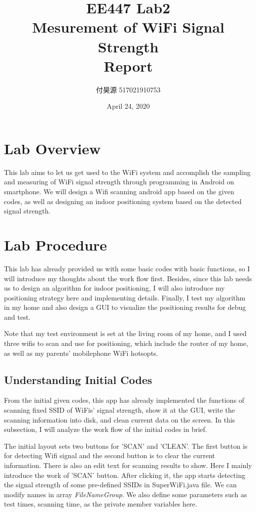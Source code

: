 \documentclass{article}
\title{\textbf{EE447 Lab2 \\ Mesurement of WiFi Signal Strength\\ Report}}
\author{付昊源 517021910753}
\date{April 24, 2020}
\begin{document}
\maketitle

\section{Lab Overview}
This lab aims to let us get used to the WiFi system and accomplish the sampling and measuring of WiFi signal strength through programming in Android on smartphone. We will design a Wifi scanning android app based on the given codes, as well as designing an indoor positioning system based on the detected signal strength.
\section{Lab Procedure}
This lab has already provided us with some basic codes with basic functions, so I will introduce my thoughts about the work flow first. Besides, since this lab needs us to design an algorithm for indoor positioning, I will also introduce my positioning strategy here and implementing details. Finally, I test my algorithm in my home and also design a GUI to visualize the positioning results for debug and test.

Note that my test environment is set at the living room of my home, and I used three wifis to scan and use for positioning, which include the router of my home, as well as my parents' mobilephone WiFi hotsopts.

\subsection{Understanding Initial Codes}
From the initial given codes, this app has already implemented the functions of scanning fixed SSID of WiFis' signal strength, show it at the GUI, write the scanning information into disk, and clean current data on the screen. In this subsection, I will analyze the work flow of the initial codes in brief.

The initial layout sets two buttons for 'SCAN' and 'CLEAN'. The first button is for detecting Wifi signal and the second button is to clear the current information. There is also an edit text for scanning results to show. Here I mainly introduce the work of 'SCAN' button. After clicking it, the app starts detecting the signal strength of some pre-defined SSIDs in SuperWiFi.java file. We can modify names in array \textit{FileNameGroup}. We also define some parameters such as test times, scanning time, as the private member variables here.
\end{document}
